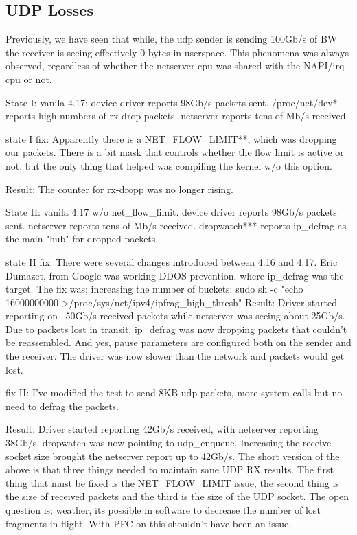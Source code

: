 \subsection{UDP Losses}
Previously, we have seen that while, the udp sender is sending 100Gb/s of BW the receiver is seeing effectively 0 bytes in userspace. This phenomena was always observed, regardless of whether the netserver cpu was shared with the NAPI/irq cpu or not.

State I:  vanila 4.17: 
device driver reports 98Gb/s packets sent.
/proc/net/dev* reports high numbers of rx-drop packets.
netserver reports tens of Mb/s received. 

state I fix: Apparently  there is  a NET\_FLOW\_LIMIT**, which was dropping our packets.
There is a bit mask that controls whether the flow limit is active or not, but the only thing that helped was compiling the kernel w/o this option.

Result: The counter for rx-dropp was no longer rising. 

State II: vanila 4.17 w/o net\_flow\_limit.
device driver reports 98Gb/s packets sent.
netserver reports tens of Mb/s received.
dropwatch*** reports ip\_defrag as the main "hub" for dropped packets.

state II fix: There were several changes introduced between 4.16 and 4.17. Eric Dumazet, from Google was working DDOS prevention, where ip\_defrag was the target.
The fix was; increasing the number of buckets:
sudo sh -c "echo 16000000000 >/proc/sys/net/ipv4/ipfrag\_high\_thresh"
Result: 
Driver started reporting on ~50Gb/s received packets while netserver was seeing about 25Gb/s. Due to packets lost in transit, ip\_defrag was now dropping packets that couldn't be reassembled. And yes, pause parameters are configured both on the sender and the receiver. The driver was now slower than the network and packets would get lost. 

fix II: I've modified the test to send 8KB udp packets, more system calls but no need to defrag the packets.

Result: Driver started reporting 42Gb/s received, with netserver reporting 38Gb/s.
dropwatch was now pointing to udp\_enqueue. Increasing the receive socket size
brought the netserver report up to 42Gb/s.
The short version of the above is that three things needed to maintain sane UDP RX results. The first thing that must be fixed is the NET\_FLOW\_LIMIT issue, the second thing is the size of received packets and the third is the size of the UDP socket.
The open question is; weather, its possible in software to decrease the number of lost fragments in flight. With PFC on this shouldn't have been an issue.

